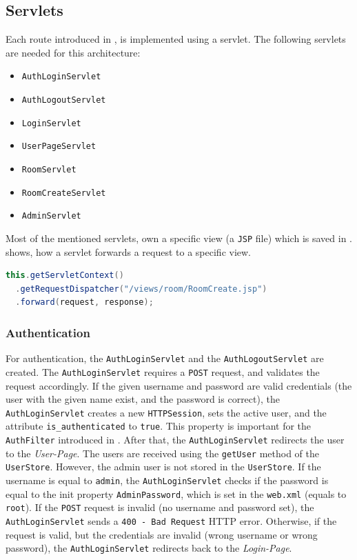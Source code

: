 \subsection{Servlets}\label{subsec:03_impl_servlets}
Each route introduced in , is implemented using a servlet. The following servlets are needed for this architecture:
\begin{itemize}
\item \texttt{AuthLoginServlet}
\item \texttt{AuthLogoutServlet}
\item \texttt{LoginServlet}
\item \texttt{UserPageServlet}
\item \texttt{RoomServlet}
\item \texttt{RoomCreateServlet}
\item \texttt{AdminServlet}
\end{itemize}
Most of the mentioned servlets, own a specific view (a \texttt{JSP} file) which is saved in .
%
 shows, how a servlet forwards a request to a specific view.
\begin{lstlisting}[label=lst:03_impl_servlets_includeview, caption=Forward a request to a view, language=java]
this.getServletContext()
  .getRequestDispatcher("/views/room/RoomCreate.jsp")
  .forward(request, response);
\end{lstlisting}


\subsubsection{Authentication}\label{subsubsec:03_impl_servlets_auth}
For authentication, the \texttt{AuthLoginServlet} and the \texttt{AuthLogoutServlet} are created.
The \texttt{AuthLoginServlet} requires a \texttt{POST} request, and validates the request accordingly. If the given username and password are valid credentials (the user with the given name exist, and the password is correct), the \texttt{AuthLoginServlet} creates a new \texttt{HTTPSession}, sets the active user, and the attribute \texttt{is\_authenticated} to \texttt{true}. This property is important for the \texttt{AuthFilter} introduced in . After that, the \texttt{AuthLoginServlet} redirects the user to the \textit{User-Page}.
The users are received using the \texttt{getUser} method of the \texttt{UserStore}.
However, the admin user is not stored in the \texttt{UserStore}. If the username is equal to \texttt{admin}, the \texttt{AuthLoginServlet} checks if the password is equal to the init property \texttt{AdminPassword}, which is set in the \texttt{web.xml} (equals to \texttt{root}).
If the \texttt{POST} request is invalid (no username and password set), the \texttt{AuthLoginServlet} sends a \texttt{400 - Bad Request} HTTP error. Otherwise, if the request is valid, but the credentials are invalid (wrong username or wrong password), the \texttt{AuthLoginServlet} redirects back to the \textit{Login-Page}.

